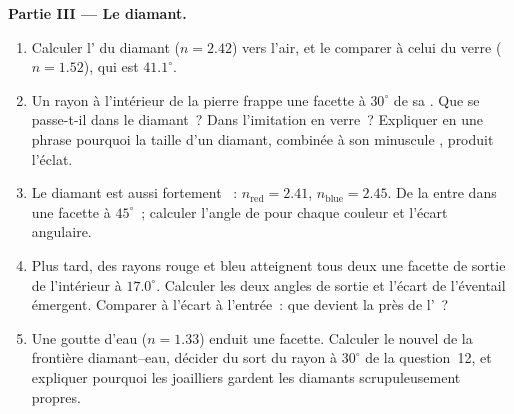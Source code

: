 \begin{problem}
\medskip
\noindent\textbf{Partie III --- Le diamant.}
\begin{enumerate}[resume]
  \item Calculer l' du diamant ($n = 2.42$) vers
        l'air, et le comparer à celui du verre ($n = 1.52$), qui est
        $41.1^\circ$.
  \item Un rayon à l'intérieur de la pierre frappe une facette à
        $30^\circ$ de sa . Que se passe-t-il dans le diamant~?
        Dans l'imitation en verre~? Expliquer en une phrase pourquoi la
        taille d'un diamant, combinée à son minuscule , produit l'éclat.
  \item Le diamant est aussi fortement ~:
        $n_{\text{red}} = 2.41$, $n_{\text{blue}} = 2.45$. De la
         entre dans une facette à $45^\circ$~;
        calculer l'angle de  pour chaque couleur et
        l'écart angulaire.
  \item Plus tard, des rayons rouge et bleu atteignent tous deux une
        facette de sortie de l'intérieur à $17.0^\circ$. Calculer les
        deux angles de sortie et l'écart de l'éventail émergent.
        Comparer à l'écart à l'entrée~: que devient la
         près de l'~?
  \item Une goutte d'eau ($n = 1.33$) enduit une facette. Calculer le
        nouvel  de la frontière diamant--eau, décider
        du sort du rayon à $30^\circ$ de la question~12, et expliquer
        pourquoi les joailliers gardent les diamants scrupuleusement
        propres.
\end{enumerate}


\end{problem}
